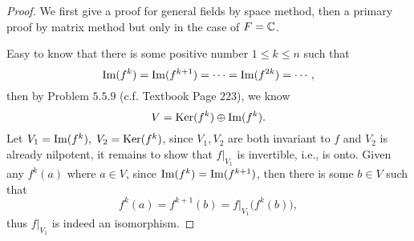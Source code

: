 \begin{proof}
	We first give a proof for general fields by space method, then a primary proof by matrix method but only in the case of $F=\mathbb{C}$. 

	Easy to know that there is some positive number $1\leq k\leq n$ such that 
	\[\operatorname*{Im}(f^k)=\operatorname*{Im}(f^{k+1})=\cdots=\operatorname*{Im}(f^{2k})=\cdots,\]
	then by Problem $5.5.9$ (c.f. Textbook Page $223$), we know 
	\[V=\operatorname*{Ker}(f^k)\oplus \operatorname*{Im} (f^k).\]
	Let $V_1=\operatorname*{Im} (f^k),\; V_2=\operatorname*{Ker} (f^k)$, since $V_1,V_2$ are both invariant to $f$ and $V_2$ is already nilpotent, it remains to show that $f|_{V_1}$ is invertible, i.e., is onto. Given any $f^k(a)$ where $a\in V$, since $\operatorname*{Im} (f^k)=\operatorname*{Im} (f^{k+1})$, then there is some $b\in V$ such that
	\[f^k(a)=f^{k+1}(b)=f|_{V_1}\big(f^k(b)\big),\]
	thus $f|_{V_1}$ is indeed an isomorphism.


\end{proof}
